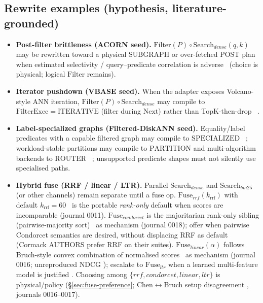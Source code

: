 \subsection{Rewrite examples (hypothesis, literature-grounded)}
\begin{itemize}
  \item \textbf{Post-filter brittleness (ACORN seed).}
    $\mathrm{Filter}(P)\circ \mathrm{Search}_{dense}(q,k)$ may be rewritten toward a physical $\mathrm{SUBGRAPH}$ or over-fetched $\mathrm{POST}$ plan when estimated selectivity / query--predicate correlation is adverse~\citep{patel2024acorn} \hypothesis{} (choice is physical; logical $\mathrm{Filter}$ remains).
  \item \textbf{Iterator pushdown (VBASE seed).}
    When the adapter exposes Volcano-style ANN iteration, $\mathrm{Filter}(P)\circ \mathrm{Search}_{dense}$ may compile to $\mathrm{FilterExec}=\mathrm{ITERATIVE}$ (filter during $\mathrm{Next}$) rather than TopK-then-drop~\citep{zhang2023vbase} \hypothesis{}.
  \item \textbf{Label-specialized graphs (Filtered-DiskANN seed).}
    Equality/label predicates with a capable filtered graph may compile to $\mathrm{SPECIALIZED}$~\citep{gollapudi2023filtered} \hypothesis{}; workload-stable partitions may compile to $\mathrm{PARTITION}$ and multi-algorithm backends to $\mathrm{ROUTER}$~\citep{lin2025fanns} \hypothesis{}; unsupported predicate shapes must not silently use specialised paths.
  \item \textbf{Hybrid fuse (RRF / linear / LTR).}
    Parallel \(\mathrm{Search}_{dense}\) and \(\mathrm{Search}_{bm25}\) (or other channels) remain separate until a fuse op.
    \(\mathrm{Fuse}_{rrf}(k_{\mathrm{rrf}})\) with default \(k_{\mathrm{rrf}}=60\)~\citep{cormack2009rrf} is the portable \emph{rank-only} default when scores are incomparable \established{} (journal 0011).
    \(\mathrm{Fuse}_{condorcet}\) is the majoritarian rank-only sibling (pairwise-majority sort)~\citep{montague2002condorcet} \established{} as mechanism (journal 0018); offer when pairwise Condorcet semantics are desired, without displacing RRF as default \hypothesis{} (Cormack AUTHORS prefer RRF on their suites).
    \(\mathrm{Fuse}_{linear}(\alpha)\) follows Bruch-style convex combination of normalised scores~\citep{bruch2023fusion} \established{} as mechanism (journal 0016; unreproduced NDCG \provisional{}); escalate to \(\mathrm{Fuse}_{ltr}\) when a learned multi-feature model is justified \hypothesis{}.
    Choosing among \(\{rrf,condorcet,linear,ltr\}\) is physical/policy \hypothesis{} (\S\ref{sec:fuse-preference}; Chen$\leftrightarrow$Bruch setup disagreement \established{}, journals 0016--0017).

\end{itemize}
